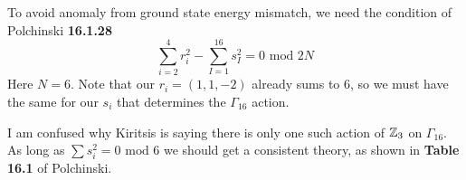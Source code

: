 \documentclass[11pt, class=article, crop=false]{standalone}
\begin{document}
\begin{enumerate}
	To avoid anomaly from ground state energy mismatch, we need the condition of Polchinski \textbf{16.1.28}
	\[
		\sum_{i=2}^4 r_i^2 - \sum_{I=1}^{16} s_I^2 = 0 \text{ mod } 2N
	\]
	Here $N = 6$. Note that our $r_i = (1,1,-2)$ already sums to $6$, so we must have the same for our $s_i$ that determines the $\Gamma_{16}$ action. 
	
	I am confused why Kiritsis is saying there is only one such action of $\mathbb{Z}_3$ on $\Gamma_{16}$. As long as $\sum s_i^2= 0 \text{ mod } 6$ we should get a consistent theory, as shown in \textbf{Table 16.1} of Polchinski. 
	
\end{enumerate}

\end{document}
